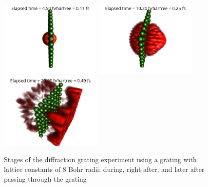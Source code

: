 \begin{figure}[hbt!]
	\begin{center}
		\includegraphics[width=0.45\textwidth]{figures/optical_grid_8_bohr_rad_01.png}
		\includegraphics[width=0.45\textwidth]{figures/optical_grid_8_bohr_rad_02.png}
		\includegraphics[width=0.45\textwidth]{figures/optical_grid_8_bohr_rad_03.png}
		\caption{Stages of the diffraction grating experiment using a grating with lattice constants of $8$ Bohr radii: during, right after, and later after passing through the grating}
		\label{fig:optical_grid_stages_8_bohr_radii}
	\end{center}	
\end{figure}

